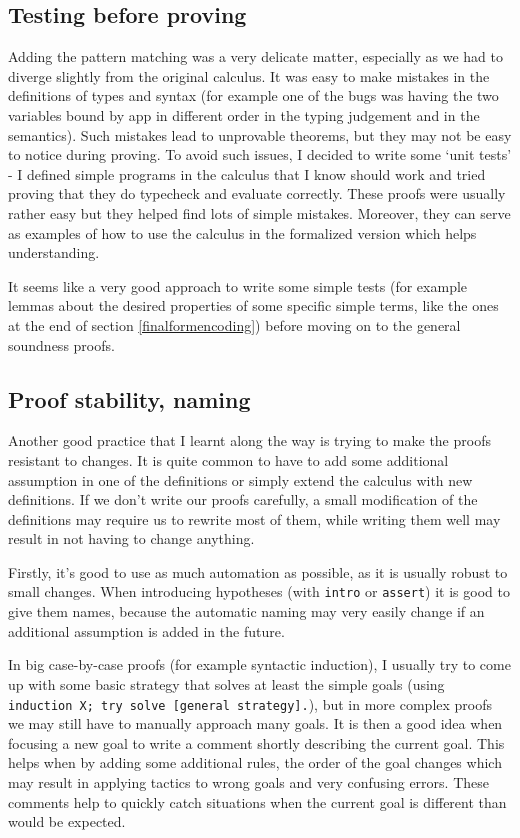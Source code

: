 \documentclass[runningheads]{article}
\begin{document}
\subsection{Testing before proving}
Adding the pattern matching was a very delicate matter, especially as we had to diverge slightly from the original calculus. It was easy to make mistakes in the definitions of types and syntax (for example one of the bugs was having the two variables bound by app in different order in the typing judgement and in the semantics). Such mistakes lead to unprovable theorems, but they may not be easy to notice during proving. To avoid such issues, I decided to write some `unit tests' - I defined simple programs in the calculus that I know should work and tried proving that they do typecheck and evaluate correctly. These proofs were usually rather easy but they helped find lots of simple mistakes. Moreover, they can serve as examples of how to use the calculus in the formalized version which helps understanding.

It seems like a very good approach to write some simple tests (for example lemmas about the desired properties of some specific simple terms, like the ones at the end of section \ref{finalformencoding}) before moving on to the general soundness proofs.



\subsection{Proof stability, naming}

Another good practice that I learnt along the way is trying to make the proofs resistant to changes. It is quite common to have to add some additional assumption in one of the definitions or simply extend the calculus with new definitions. If we don't write our proofs carefully, a small modification of the definitions may require us to rewrite most of them, while writing them well may result in not having to change anything.

Firstly, it's good to use as much automation as possible, as it is usually robust to small changes. When introducing hypotheses (with \verb|intro| or \verb|assert|) it is good to give them names, because the automatic naming may very easily change if an additional assumption is added in the future.

In big case-by-case proofs (for example syntactic induction), I usually try to come up with some basic strategy that solves at least the simple goals (using \verb|induction X; try solve [general strategy].|), but in more complex proofs we may still have to manually approach many goals. It is then a good idea when focusing a new goal to write a comment shortly describing the current goal. This helps when by adding some additional rules, the order of the goal changes which may result in applying tactics to wrong goals and very confusing errors. These comments help to quickly catch situations when the current goal is different than would be expected.
\end{document}

